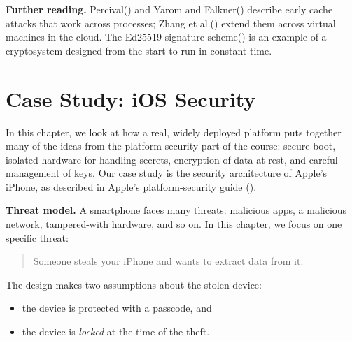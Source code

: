 \documentclass[
  letterpaper,
]{scrbook}
\providecommand{\tightlist}{%
  \setlength{\itemsep}{0pt}\setlength{\parskip}{0pt}}
\theoremstyle{definition}
\theoremstyle{plain}
\theoremstyle{plain}
\theoremstyle{remark}
\begin{document}
\textbf{Further reading.}
Percival() and Yarom and
Falkner()
describe early cache attacks that work across processes; Zhang et
al.() extend them across
virtual machines in the cloud. The Ed25519 signature
scheme() is an
example of a cryptosystem designed from the start to run in constant
time.

\chapter{Case Study: iOS Security}\label{case-study-ios-security}

In this chapter, we look at how a real, widely deployed platform puts
together many of the ideas from the platform-security part of the
course: secure boot, isolated hardware for handling secrets, encryption
of data at rest, and careful management of keys. Our case study is the
security architecture of Apple's iPhone, as described in Apple's
platform-security guide ().

\textbf{Threat model.} A smartphone faces many threats: malicious apps,
a malicious network, tampered-with hardware, and so on. In this chapter,
we focus on one specific threat:

\begin{quote}
Someone steals your iPhone and wants to extract data from it.
\end{quote}

The design makes two assumptions about the stolen device:

\begin{itemize}
\tightlist
\item
  the device is protected with a passcode, and
\item
  the device is \emph{locked} at the time of the theft.
\end{itemize}

\end{document}
